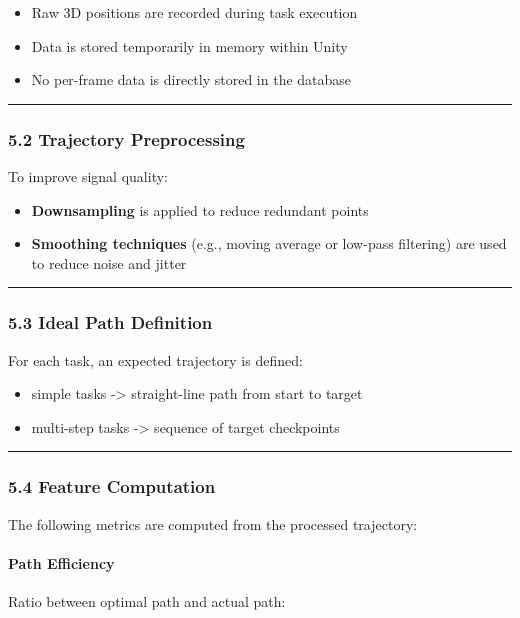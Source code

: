 \documentclass[11pt]{article}
\begin{document}
\begin{itemize}
\item Raw 3D positions are recorded during task execution
\item Data is stored temporarily in memory within Unity
\item No per-frame data is directly stored in the database
\end{itemize}

\hrule


\subsubsection*{5.2 Trajectory Preprocessing}


To improve signal quality:


\begin{itemize}
\item \textbf{Downsampling} is applied to reduce redundant points
\item \textbf{Smoothing techniques} (e.g., moving average or low-pass filtering) are used to reduce noise and jitter
\end{itemize}

\hrule


\subsubsection*{5.3 Ideal Path Definition}


For each task, an expected trajectory is defined:


\begin{itemize}
\item simple tasks -> straight-line path from start to target
\item multi-step tasks -> sequence of target checkpoints
\end{itemize}

\hrule


\subsubsection*{5.4 Feature Computation}


The following metrics are computed from the processed trajectory:


\paragraph*{Path Efficiency}

Ratio between optimal path and actual path:
\end{document}
